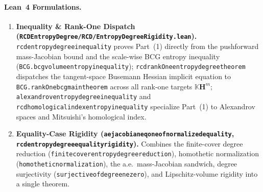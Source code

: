 \documentclass[10pt]{article}
\renewcommand{\_}{\origus\allowbreak}
\newcommand{\code}[1]{\texttt{#1}}
\begin{document}
\paragraph{Lean~4 Formulations.}
\begin{enumerate}\sloppy
\item \textbf{Inequality \& Rank-One Dispatch (\code{RCDEntropyDegree/RCD/EntropyDegreeRigidity.lean}).}
\code{rcd\_entropy\_degree\_inequality} proves Part~(1) directly from the pushforward mass-Jacobian
bound and the scale-wise BCG entropy inequality (\code{BCG.bcg\_volume\_entropy\_inequality});
\code{rcd\_rankOne\_entropy\_degree\_theorem} dispatches the tangent-space Busemann Hessian implicit
equation to \code{BCG.rankOne\_bcg\_main\_theorem} across all rank-one targets $\mathbb{K}\mathbf{H}^m$;
\code{alexandrov\_entropy\_degree\_inequality} and \code{rcd\_homological\_index\_entropy\_inequality}
specialize Part~(1) to Alexandrov spaces and Mitsuishi's homological index.
\item \textbf{Equality-Case Rigidity (\code{ae\_jacobian\_eq\_one\_of\_normalized\_equality},
\code{rcd\_entropy\_degree\_equality\_rigidity}).} Combines the finite-cover degree reduction
(\code{finite\_cover\_entropy\_degree\_reduction}), homothetic normalization
(\code{homothetic\_normalization}), the a.e.\ mass-Jacobian sandwich, degree surjectivity
(\code{surjective\_of\_degree\_ne\_zero}), and Lipschitz-volume rigidity into a single theorem.
\end{enumerate}
\end{document}
